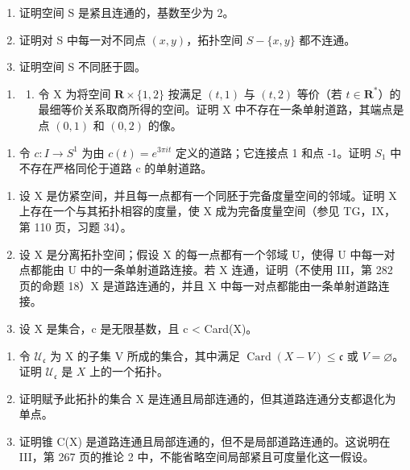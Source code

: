 \begin{enumerate}
\def\labelenumi{\alph{enumi})}
\item
  证明空间 S 是紧且连通的，基数至少为 2。
\item
  证明对 S 中每一对不同点 \((x,y)\)，拓扑空间 \(S-\{x,y\}\) 都不连通。
\item
  证明空间 S 不同胚于圆。
\end{enumerate}

\begin{enumerate}
\def\labelenumi{\arabic{enumi})}
\setcounter{enumi}{10}
\tightlist
\item
  \begin{enumerate}
  \def\labelenumii{\alph{enumii})}
  \tightlist
  \item
    令 X 为将空间 \(\mathbf{R} \times \{1, 2\}\) 按满足 \((t, 1)\) 与 \((t, 2)\) 等价（若 \(t \in \mathbf{R}^*\)）的最细等价关系取商所得的空间。证明 X 中不存在一条单射道路，其端点是点 \((0, 1)\) 和 \((0, 2)\) 的像。
  \end{enumerate}
\end{enumerate}

\begin{enumerate}
\def\labelenumi{\alph{enumi})}
\setcounter{enumi}{1}
\tightlist
\item
  令 \(c: I \to S^{1}\) 为由 \(c(t) = e^{3\pi it}\) 定义的道路；它连接点 1 和点 -1。证明 \(S_{1}\) 中不存在严格同伦于道路 c 的单射道路。
\end{enumerate}

\begin{enumerate}
\def\labelenumi{\arabic{enumi})}
\setcounter{enumi}{11}
\item
  设 X 是仿紧空间，并且每一点都有一个同胚于完备度量空间的邻域。证明 X 上存在一个与其拓扑相容的度量，使 X 成为完备度量空间（参见 TG，IX，第 110 页，习题 34）。
\item
  设 X 是分离拓扑空间；假设 X 的每一点都有一个邻域 U，使得 U 中每一对点都能由 U 中的一条单射道路连接。若 X 连通，证明（不使用 III，第 282 页的命题 18）X 是道路连通的，并且 X 中每一对点都能由一条单射道路连接。
\item
  设 X 是集合，c 是无限基数，且 c \textless{} Card(X)。
\end{enumerate}

\begin{enumerate}
\def\labelenumi{\alph{enumi})}
\item
  令 \(\mathcal{U}_{\mathfrak{c}}\) 为 X 的子集 V 所成的集合，其中满足 \(\operatorname{Card}(X - V) \leqslant \mathfrak{c}\) 或 \(V = \varnothing\)。证明 \(\mathcal{U}_{\mathfrak{c}}\) 是 \(X\) 上的一个拓扑。
\item
  证明赋予此拓扑的集合 X 是连通且局部连通的，但其道路连通分支都退化为单点。
\item
  证明锥 C(X) 是道路连通且局部连通的，但不是局部道路连通的。这说明在 III，第 267 页的推论 2 中，不能省略空间局部紧且可度量化这一假设。
\end{enumerate}

